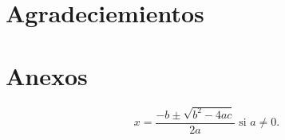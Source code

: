 \documentclass{wscpaperproc}
\theoremstyle{wsc}
\begin{document}
\section*{Agradeciemientos}


\appendix

\section{Anexos} \label{app:quadratic}

\begin{equation} \label{eq:quadraticsol}
x = \frac{-b \pm \sqrt{b^2-4ac}}{2a} \mbox{ si } a \ne 0.
\end{equation}
\end{document}
